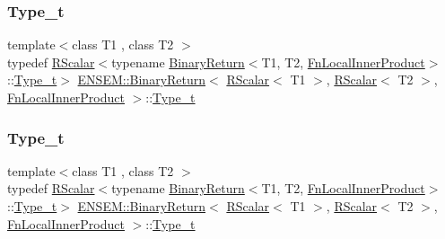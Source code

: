 \subsubsection{\texorpdfstring{Type\_t}{Type\_t}\hspace{0.1cm}{\footnotesize\ttfamily [2/3]}}
{\footnotesize\ttfamily template$<$class T1 , class T2 $>$ \\
typedef \mbox{\hyperlink{classENSEM_1_1RScalar}{R\+Scalar}}$<$typename \mbox{\hyperlink{structENSEM_1_1BinaryReturn}{Binary\+Return}}$<$T1, T2, \mbox{\hyperlink{structENSEM_1_1FnLocalInnerProduct}{Fn\+Local\+Inner\+Product}}$>$\+::\mbox{\hyperlink{structENSEM_1_1BinaryReturn_3_01RScalar_3_01T1_01_4_00_01RScalar_3_01T2_01_4_00_01FnLocalInnerProduct_01_4_a0b84b9f7bc7dfb44e916186f013e5213}{Type\+\_\+t}}$>$ \mbox{\hyperlink{structENSEM_1_1BinaryReturn}{E\+N\+S\+E\+M\+::\+Binary\+Return}}$<$ \mbox{\hyperlink{classENSEM_1_1RScalar}{R\+Scalar}}$<$ T1 $>$, \mbox{\hyperlink{classENSEM_1_1RScalar}{R\+Scalar}}$<$ T2 $>$, \mbox{\hyperlink{structENSEM_1_1FnLocalInnerProduct}{Fn\+Local\+Inner\+Product}} $>$\+::\mbox{\hyperlink{structENSEM_1_1BinaryReturn_3_01RScalar_3_01T1_01_4_00_01RScalar_3_01T2_01_4_00_01FnLocalInnerProduct_01_4_a0b84b9f7bc7dfb44e916186f013e5213}{Type\+\_\+t}}}

\mbox{\label{structENSEM_1_1BinaryReturn_3_01RScalar_3_01T1_01_4_00_01RScalar_3_01T2_01_4_00_01FnLocalInnerProduct_01_4_a0b84b9f7bc7dfb44e916186f013e5213}} 
\subsubsection{\texorpdfstring{Type\_t}{Type\_t}\hspace{0.1cm}{\footnotesize\ttfamily [3/3]}}
{\footnotesize\ttfamily template$<$class T1 , class T2 $>$ \\
typedef \mbox{\hyperlink{classENSEM_1_1RScalar}{R\+Scalar}}$<$typename \mbox{\hyperlink{structENSEM_1_1BinaryReturn}{Binary\+Return}}$<$T1, T2, \mbox{\hyperlink{structENSEM_1_1FnLocalInnerProduct}{Fn\+Local\+Inner\+Product}}$>$\+::\mbox{\hyperlink{structENSEM_1_1BinaryReturn_3_01RScalar_3_01T1_01_4_00_01RScalar_3_01T2_01_4_00_01FnLocalInnerProduct_01_4_a0b84b9f7bc7dfb44e916186f013e5213}{Type\+\_\+t}}$>$ \mbox{\hyperlink{structENSEM_1_1BinaryReturn}{E\+N\+S\+E\+M\+::\+Binary\+Return}}$<$ \mbox{\hyperlink{classENSEM_1_1RScalar}{R\+Scalar}}$<$ T1 $>$, \mbox{\hyperlink{classENSEM_1_1RScalar}{R\+Scalar}}$<$ T2 $>$, \mbox{\hyperlink{structENSEM_1_1FnLocalInnerProduct}{Fn\+Local\+Inner\+Product}} $>$\+::\mbox{\hyperlink{structENSEM_1_1BinaryReturn_3_01RScalar_3_01T1_01_4_00_01RScalar_3_01T2_01_4_00_01FnLocalInnerProduct_01_4_a0b84b9f7bc7dfb44e916186f013e5213}{Type\+\_\+t}}}



